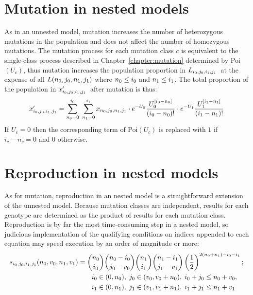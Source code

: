 \documentclass[10pt,twoside,a4paper,fleqn]{report}
\numberwithin{equation}{section}  %
\newcommand{\ProbDist}[2]{\mbox{{#1}$(#2)$}}
\newcommand{\izero}{\mbox{$i_0$\/}}
\newcommand{\jzero}{\mbox{$j_0$\/}}
\newcommand{\ione}{\mbox{$i_1$\/}}
\newcommand{\jone}{\mbox{$j_1$\/}}
\newcommand{\nzero}{\mbox{$n_0$\/}}
\newcommand{\none}{\mbox{$n_1$\/}}
\newcommand{\Lijij}{\mbox{$L_{i_0\/,j_0\/,i_1\/,j_1\/}$}}
\newcommand{\xpijij}{\mbox{$x'_{i_0\/,j_0\/,i_1\/,j_1\/}$}}
\newcommand{\funcselfnested}{\mbox{$s_{i_0\/,j_0\/,i_1\/,j_1\/}(n_0\/,v_0\/,n_1\/,v_1\/)$}}
\begin{document}
{%
\section{Mutation in nested models}

As in an unnested model, mutation increases the number of heterozygous mutations in the population and does not affect the number of homozygous mutations.  The mutation process for each mutation class $c$ is equivalent to the single-class process described in Chapter~\ref{chapter:mutation} determined by \ProbDist{Poi}{U_c}, thus mutation increases the population proportion in \Lijij\ at the expense of all $L(\nzero,\jzero,\none,\jone)$ where $\nzero\le\izero$ and $\none\le\ione$.  The total proportion of the population in \xpijij\ after mutation is thus:
\begin{equation}\label{eq:nested:fullequation}
    \xpijij = \sum_{n_0=0}^{i_0}{\; \sum_{n_1=0}^{i_1}{x_{n_0,j_0,n_1,j_1} \cdot e^{-U_0} \frac{U_0^{[i_0-n_0]}}{(\izero-\nzero)!} \cdot e^{-U_1} \frac{U_1^{[i_1-n_1]}}{(\ione-\none)!}}}
\end{equation}
If $U_c=0$ then the corresponding term of \ProbDist{Poi}{U_c} is replaced with $1$ if $i_c-n_c=0$ and $0$ otherwise.
\section{Reproduction in nested models}

As for mutation, reproduction in an nested model is a straightforward extension of the unnested model.  Because mutation classes are independent, results for each genotype are determined as the product of results for each mutation class.  Reproduction is by far the most time-consuming step in a nested model, so judicious implementation of the qualifying conditions on indices appended to each equation may speed execution by an order of magnitude or more:
\begin{equation}
\label{eq:nested:s}
\begin{split}
  \funcselfnested &= \binom{n_0}{i_0}\binom{n_0-i_0}{j_0-v_0}\binom{n_1}{i_1}\binom{n_1-i_1}{j_1-v_1}\left({\frac{1}{2}}\right)^{2(n_0+n_1)-i_0-i_1} ; \\
  & \qquad i_0\in(0,n_0),\;j_0\in(v_0,v_0 + n_0),\;i_0+j_0 \leq n_0+v_0,\\
  & \qquad i_1\in(0,n_1),\;j_1\in(v_1,v_1 + n_1),\;i_1+j_1 \leq n_1+v_1 
\end{split}
\end{equation}

}
\end{document}
